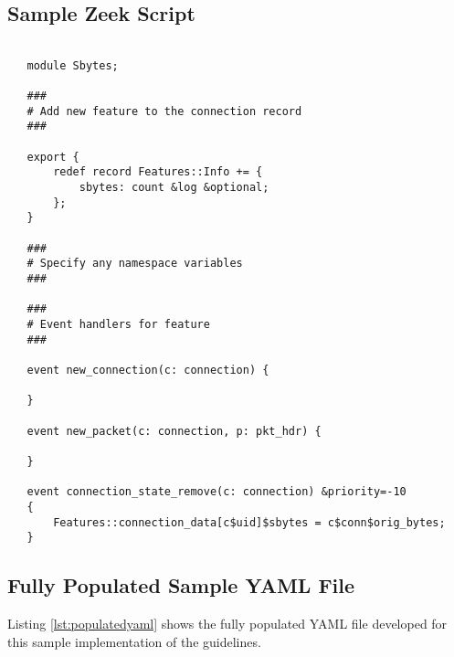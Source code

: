 \documentclass[sigconf]{acmart}
\begin{document}
\begin{minipage}{\linewidth}
\subsection{Sample Zeek Script}
\begin{lstlisting}[label=lst:zeeksamplescript, caption={
    A sample Zeek script that creates the single feature for source bytes.
    This script would be identified in a $\_\_load\_\_.zeek$ file and executed using the Zeek wrapper script provided by our sample implementation.
    Each script provides the feature name and implements supported Zeek callback functions.
    While we provide a default set of callbacks, others could  be added to this file if needed.
    One can see that breaking up the features into their own code unit makes understanding how they are generated straightforward.
    }, captionpos=b, basicstyle=\small, backgroundcolor=\color{gray!10!white}, frame=stb, breaklines=True]

   module Sbytes;
   
   ###
   # Add new feature to the connection record
   ###
   
   export {
       redef record Features::Info += {
           sbytes: count &log &optional;
       };
   }
   
   ###
   # Specify any namespace variables
   ###
   
   ###
   # Event handlers for feature
   ###
   
   event new_connection(c: connection) {
   
   }
   
   event new_packet(c: connection, p: pkt_hdr) {
   
   }
   
   event connection_state_remove(c: connection) &priority=-10
   {
       Features::connection_data[c$uid]$sbytes = c$conn$orig_bytes;
   }
\end{lstlisting}
\end{minipage}


\subsection{Fully Populated Sample YAML File}
Listing \ref{lst:populatedyaml} shows the fully populated YAML file developed for this sample implementation of the guidelines.
\end{document}
